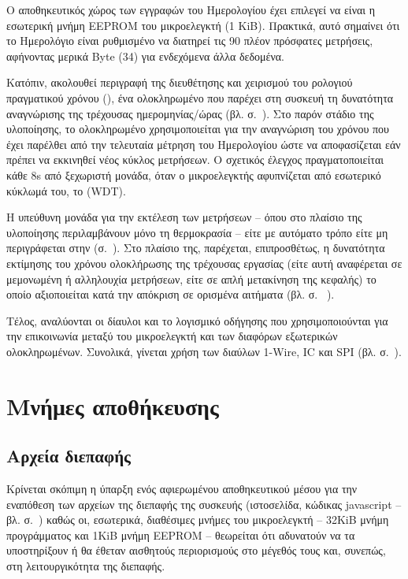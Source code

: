 Ο αποθηκευτικός χώρος των εγγραφών του Ημερολογίου έχει επιλεγεί να είναι η
εσωτερική μνήμη EEPROM του μικροελεγκτή (1 KiB). Πρακτικά, αυτό σημαίνει ότι το
Ημερολόγιο είναι ρυθμισμένο να διατηρεί τις 90 πλέον πρόσφατες μετρήσεις,
αφήνοντας μερικά Byte (34) για ενδεχόμενα άλλα δεδομένα.

Κατόπιν, ακολουθεί περιγραφή της διευθέτησης και χειρισμού του ρολογιού
πραγματικού χρόνου (), ένα ολοκληρωμένο που παρέχει
στη συσκευή τη δυνατότητα αναγνώρισης της τρέχουσας ημερομηνίας\slash{}ώρας
(βλ.  σ.~\pageref{sec:rtc}). Στο παρόν στάδιο της υλοποίησης,
το ολοκληρωμένο χρησιμοποιείται για την αναγνώριση του χρόνου που έχει παρέλθει
από την τελευταία μέτρηση του Ημερολογίου ώστε να αποφασίζεται εάν πρέπει να
εκκινηθεί νέος κύκλος μετρήσεων. Ο σχετικός έλεγχος πραγματοποιείται κάθε 8s από
ξεχωριστή μονάδα, όταν ο μικροελεγκτής αφυπνίζεται από εσωτερικό κύκλωμά
του, το  (WDT).

Η υπεύθυνη μονάδα για την εκτέλεση των μετρήσεων -- όπου στο πλαίσιο της
υλοποίησης περιλαμβάνουν μόνο τη θερμοκρασία -- είτε με αυτόματο τρόπο είτε μη
περιγράφεται στην  (σ.~\pageref{sec:task}). Στο πλαίσιο της,
παρέχεται, επιπροσθέτως, η δυνατότητα εκτίμησης του χρόνου ολοκλήρωσης της
τρέχουσας εργασίας (είτε αυτή αναφέρεται σε μεμονωμένη ή αλληλουχία μετρήσεων,
είτε σε απλή μετακίνηση της κεφαλής) το οποίο αξιοποιείται κατά την απόκριση σε
ορισμένα αιτήματα (βλ.  σ.~%
\pageref{sec:network:impl-resources}).

Τέλος, αναλύονται οι δίαυλοι και το λογισμικό οδήγησης που χρησιμοποιούνται για
την επικοινωνία μεταξύ του μικροελεγκτή και των διαφόρων εξωτερικών
ολοκληρωμένων. Συνολικά, γίνεται χρήση των διαύλων 1-Wire, ΙC και SPI
(βλ.  σ.~\pageref{sec:buses}).


\section{Μνήμες αποθήκευσης}

\subsection{Αρχεία διεπαφής}
\label{subsec:external-memory}

Κρίνεται σκόπιμη η ύπαρξη ενός αφιερωμένου αποθηκευτικού μέσου για την εναπόθεση
των αρχείων της διεπαφής της συσκευής (ιστοσελίδα, κώδικας javascript  --
βλ.  σ.~\pageref{subsec:network:files}) καθώς οι,
εσωτερικά, διαθέσιμες μνήμες του μικροελεγκτή -- 32KiB μνήμη προγράμματος και
1KiB μνήμη EEPROM -- θεωρείται ότι αδυνατούν να τα υποστηρίξουν ή θα έθεταν
αισθητούς περιορισμούς στο μέγεθός τους και, συνεπώς, στη λειτουργικότητα της
διεπαφής.

